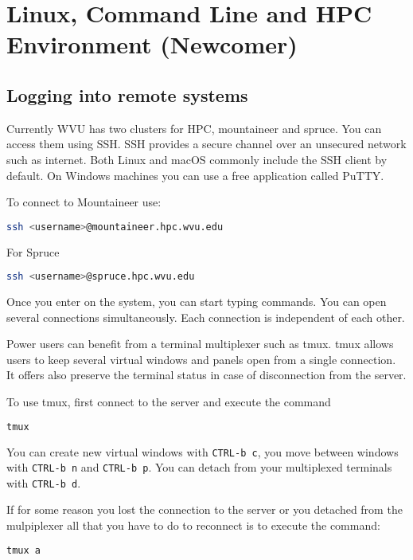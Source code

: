 \chapter{Linux, Command Line and HPC Environment (Newcomer)}


\section{Logging into remote systems}

Currently WVU has two clusters for HPC, mountaineer and spruce. You can access them using SSH.
SSH provides a secure channel over an unsecured network such as internet.
Both Linux and macOS commonly include the SSH client by default. On Windows machines you can use a free application called PuTTY.

To connect to Mountaineer use:

\begin{lstlisting}[language=bash]
ssh <username>@mountaineer.hpc.wvu.edu
\end{lstlisting}

For Spruce

\begin{lstlisting}[language=bash]
ssh <username>@spruce.hpc.wvu.edu
\end{lstlisting}

Once you enter on the system, you can start typing commands. You can open several connections simultaneously. Each connection is independent of each other.

Power users can benefit from a terminal multiplexer such as tmux. tmux allows users to keep several virtual windows and panels open from a single connection. It offers also preserve the terminal status in case of disconnection from the server.

To use tmux, first connect to the server and execute the command

\begin{lstlisting}[language=bash]
tmux
\end{lstlisting}

You can create new virtual windows with \texttt{CTRL-b c}, you move between windows with \texttt{CTRL-b n} and \texttt{CTRL-b p}. You can detach from your multiplexed terminals with \texttt{CTRL-b d}. 

If for some reason you lost the connection to the server or you detached from the mulpiplexer all that you have to do to reconnect is to execute the command:

\begin{lstlisting}[language=bash]
tmux a
\end{lstlisting}

